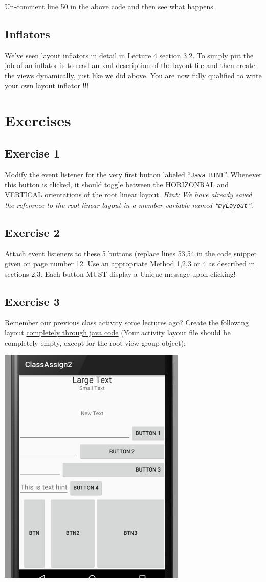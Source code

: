 Un-comment line 50 in the above code and then see what happens.

\subsection{Inflators}
We've seen layout inflators in detail in Lecture 4 section 3.2. To simply put the job of an inflator is to read an xml description of the layout file and then create the views dynamically, just like we did above. You are now fully qualified to write your own layout inflator !!!

\section{Exercises}
\subsection{Exercise 1}
Modify the event listener for the very first button labeled ``\texttt{Java BTN1}''. Whenever this button is clicked, it should toggle between the HORIZONRAL and VERTICAL orientations of the root linear layout. \textit{Hint: We have already saved the reference to the root linear layout in a member variable named ``\texttt{myLayout}''}.

\subsection{Exercise 2}
Attach event listeners to these 5 buttons (replace lines 53,54 in the code snippet given on page number 12. Use an appropriate Method 1,2,3 or 4 as described in sections 2.3. Each button MUST display a Unique message upon clicking!

\subsection{Exercise 3}
Remember our previous class activity some lectures ago? Create the following layout \underline{completely through java code} (Your activity layout file should be completely empty, except for the root view group object):

\begin{center}
	\includegraphics[scale=0.4]{chapters/ch05/images/29}
\end{center}

